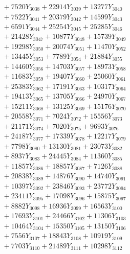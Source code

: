 \documentclass[a4paper,10pt]{article}
\begin{document}
{\begin{align}
&\;  + 7520 Y_{3038} + 22914 Y_{3039} + 13277 Y_{3040} \\[0.3ex]
&\;  + 7522 Y_{3041} + 20379 Y_{3042} + 14599 Y_{3043} \\[0.3ex]
&\;  + 6591 Y_{3044} + 25254 Y_{3045} + 25285 Y_{3046} \\[0.3ex]
&\;  + 21428 Y_{3047} + 10877 Y_{3048} + 15739 Y_{3049} \\[0.3ex]
&\;  + 19298 Y_{3050} + 20074 Y_{3051} + 11470 Y_{3052} \\[0.3ex]
&\;  + 13445 Y_{3053} + 7789 Y_{3054} + 21884 Y_{3055} \\[0.3ex]
&\;  + 14460 Y_{3056} + 14703 Y_{3057} + 18973 Y_{3058} \\[0.5ex]\allowbreak
&\;  + 11683 Y_{3059} + 19407 Y_{3060} + 25060 Y_{3061} \\[0.3ex]
&\;  + 25383 Y_{3062} + 17191 Y_{3063} + 10317 Y_{3064} \\[0.3ex]
&\;  + 19413 Y_{3065} + 13705 Y_{3066} + 24970 Y_{3067} \\[0.3ex]
&\;  + 15211 Y_{3068} + 13125 Y_{3069} + 15176 Y_{3070} \\[0.3ex]
&\;  + 20558 Y_{3071} + 7024 Y_{3072} + 15556 Y_{3073} \\[0.3ex]
&\;  + 21171 Y_{3074} + 7020 Y_{3075} + 9693 Y_{3076} \\[0.3ex]
&\;  + 24187 Y_{3077} + 17339 Y_{3078} + 12217 Y_{3079} \\[0.3ex]
&\;  + 7798 Y_{3080} + 13130 Y_{3081} + 23073 Y_{3082} \\[0.3ex]
&\;  + 8937 Y_{3083} + 24445 Y_{3084} + 11360 Y_{3085} \\[0.3ex]
&\;  + 11857 Y_{3086} + 18857 Y_{3087} + 7126 Y_{3088} \\[0.5ex]\allowbreak
&\;  + 20838 Y_{3089} + 14876 Y_{3090} + 14740 Y_{3091} \\[0.3ex]
&\;  + 10397 Y_{3092} + 23846 Y_{3093} + 23772 Y_{3094} \\[0.3ex]
&\;  + 23411 Y_{3095} + 17098 Y_{3096} + 15875 Y_{3097} \\[0.3ex]
&\;  + 8882 Y_{3098} + 16936 Y_{3099} + 16563 Y_{3100} \\[0.3ex]
&\;  + 17693 Y_{3101} + 24466 Y_{3102} + 11306 Y_{3103} \\[0.3ex]
&\;  + 10464 Y_{3104} + 15350 Y_{3105} + 13150 Y_{3106} \\[0.3ex]
&\;  + 7556 Y_{3107} + 18843 Y_{3108} + 10919 Y_{3109} \\[0.3ex]
&\;  + 7703 Y_{3110} + 21489 Y_{3111} + 10298 Y_{3112} \\[0.3ex]

\end{align}}
\end{document}
